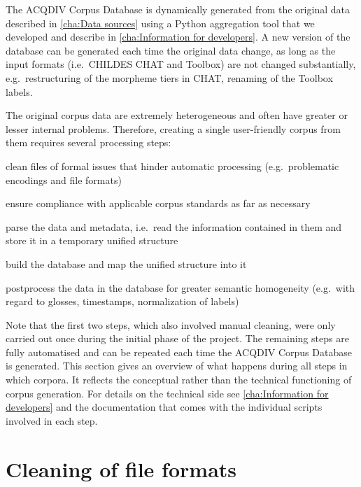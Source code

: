 \documentclass[a4paper, 11pt]{book}
\begin{document}
The ACQDIV Corpus Database is dynamically generated from the original data described in \autoref{cha:Data sources} using a Python aggregation tool that we developed and describe in \autoref{cha:Information for developers}. A new version of the database can be generated each time the original data change, as long as the input formats (i.e.\ CHILDES CHAT and Toolbox) are not changed substantially, e.g.\ restructuring of the morpheme tiers in CHAT, renaming of the Toolbox labels. 

The original corpus data are extremely heterogeneous and often have greater or lesser internal problems. Therefore, creating a single user-friendly corpus from them requires several processing steps: 

\begin{itemize*}
	\item clean files of formal issues that hinder automatic processing (e.g.\ problematic encodings and file formats)
	\item ensure compliance with applicable corpus standards as far as necessary
	\item parse the data and metadata, i.e.\ read the information contained in them and store it in a temporary unified structure
	\item build the database and map the unified structure into it
	\item postprocess the data in the database for greater semantic homogeneity (e.g.\ with regard to glosses, timestamps, normalization of labels)
\end{itemize*}


Note that the first two steps, which also involved manual cleaning, were only carried out once during the initial phase of the project. The remaining steps are fully automatised and can be repeated each time the ACQDIV Corpus Database is generated. This section gives an overview of what happens during all steps in which corpora. It reflects the conceptual rather than the technical functioning of corpus generation. For details on the technical side see \autoref{cha:Information for developers} and the documentation that comes with the individual scripts involved in each step.


\section{Cleaning of file formats}
\label{sec:Cleaning of file formats}
\end{document}
